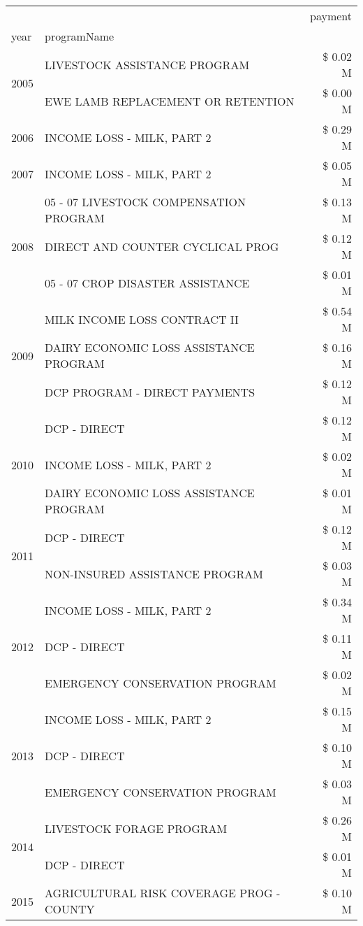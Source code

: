\begin{tabular}{llr}
\toprule
 &  & payment \\
year & programName &  \\
\midrule
\multirow[t]{2}{*}{2005} & LIVESTOCK ASSISTANCE PROGRAM & \$ 0.02 M \\
 & EWE LAMB REPLACEMENT OR RETENTION & \$ 0.00 M \\
\cline{1-3}
2006 & INCOME LOSS - MILK, PART 2 & \$ 0.29 M \\
\cline{1-3}
2007 & INCOME LOSS - MILK, PART 2 & \$ 0.05 M \\
\cline{1-3}
\multirow[t]{3}{*}{2008} & 05 - 07 LIVESTOCK COMPENSATION PROGRAM & \$ 0.13 M \\
 & DIRECT AND COUNTER CYCLICAL PROG & \$ 0.12 M \\
 & 05 - 07 CROP DISASTER ASSISTANCE & \$ 0.01 M \\
\cline{1-3}
\multirow[t]{3}{*}{2009} & MILK INCOME LOSS CONTRACT II & \$ 0.54 M \\
 & DAIRY ECONOMIC LOSS ASSISTANCE PROGRAM & \$ 0.16 M \\
 & DCP PROGRAM - DIRECT PAYMENTS & \$ 0.12 M \\
\cline{1-3}
\multirow[t]{3}{*}{2010} & DCP - DIRECT & \$ 0.12 M \\
 & INCOME LOSS - MILK, PART 2 & \$ 0.02 M \\
 & DAIRY ECONOMIC LOSS ASSISTANCE PROGRAM & \$ 0.01 M \\
\cline{1-3}
\multirow[t]{2}{*}{2011} & DCP - DIRECT & \$ 0.12 M \\
 & NON-INSURED ASSISTANCE PROGRAM & \$ 0.03 M \\
\cline{1-3}
\multirow[t]{3}{*}{2012} & INCOME LOSS - MILK, PART 2 & \$ 0.34 M \\
 & DCP - DIRECT & \$ 0.11 M \\
 & EMERGENCY CONSERVATION PROGRAM & \$ 0.02 M \\
\cline{1-3}
\multirow[t]{3}{*}{2013} & INCOME LOSS - MILK, PART 2 & \$ 0.15 M \\
 & DCP - DIRECT & \$ 0.10 M \\
 & EMERGENCY CONSERVATION PROGRAM & \$ 0.03 M \\
\cline{1-3}
\multirow[t]{2}{*}{2014} & LIVESTOCK FORAGE PROGRAM & \$ 0.26 M \\
 & DCP - DIRECT & \$ 0.01 M \\
\cline{1-3}
\multirow[t]{2}{*}{2015} & AGRICULTURAL RISK COVERAGE PROG - COUNTY & \$ 0.10 M \\

\end{tabular}
